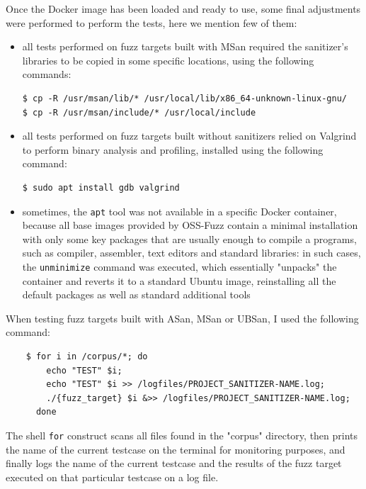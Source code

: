 Once the Docker image has been loaded and ready to use, some final adjustments were performed to perform the tests, here we mention few of them:
\begin{itemize}
    \item all tests performed on fuzz targets built with MSan required the sanitizer's libraries to be copied in some specific locations, using the following commands:
\begin{verbatim}
$ cp -R /usr/msan/lib/* /usr/local/lib/x86_64-unknown-linux-gnu/
$ cp -R /usr/msan/include/* /usr/local/include
\end{verbatim}
    \item all tests performed on fuzz targets built without sanitizers relied on Valgrind to perform binary analysis and profiling, installed using the following command:
\begin{verbatim}
$ sudo apt install gdb valgrind
\end{verbatim}
    \item sometimes, the \verb|apt| tool was not available in a specific Docker container, because all base images provided by OSS-Fuzz contain a minimal installation with only some key packages that are usually enough to compile a programs, such as compiler, assembler, text editors and standard libraries: in such cases, the \verb|unminimize| command was executed, which essentially "unpacks" the container and reverts it to a standard Ubuntu image, reinstalling all the default packages as well as standard additional tools
\end{itemize}












\newpage
When testing fuzz targets built with ASan, MSan or UBSan, I used the following command:
\begin{verbatim}
    $ for i in /corpus/*; do 
        echo "TEST" $i; 
        echo "TEST" $i >> /logfiles/PROJECT_SANITIZER-NAME.log; 
        ./{fuzz_target} $i &>> /logfiles/PROJECT_SANITIZER-NAME.log; 
      done
\end{verbatim}
The shell \verb|for| construct scans all files found in the "corpus" directory, then prints the name of the current testcase on the terminal for monitoring purposes, and finally logs the name of the current testcase and the results of the fuzz target executed on that particular testcase on a log file.

